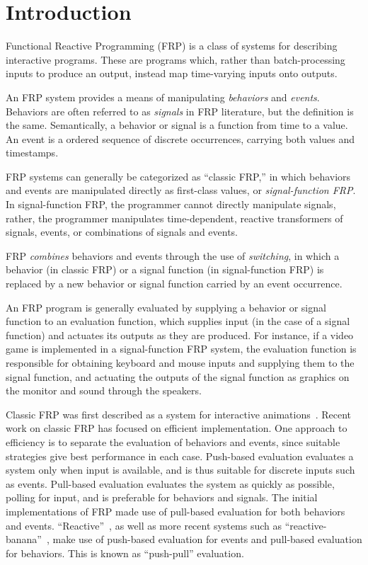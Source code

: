 \section{Introduction}
\label{section:Introduction}

Functional Reactive Programming (FRP) is a class of systems for describing
interactive programs. These are programs which, rather than batch-processing
inputs to produce an output, instead map time-varying inputs onto outputs.


An FRP system provides a means of manipulating {\em behaviors} and
{\em events}. Behaviors are often referred to as {\em signals} in FRP literature,
but the definition is the same.  Semantically, a behavior or signal is a
function from time to a value. An event is a ordered sequence of discrete
occurrences, carrying both values and timestamps.

FRP systems can generally be categorized as ``classic FRP,'' in which behaviors
and events are manipulated directly as first-class values,
or {\em signal-function FRP}. In signal-function FRP, the programmer cannot
directly manipulate signals, rather, the programmer manipulates time-dependent,
reactive transformers of signals, events, or combinations of signals and events.

FRP {\em combines} behaviors and events through the use of {\em switching}, in which
a behavior (in classic FRP) or a signal function (in signal-function FRP) is
replaced by a new behavior or signal function carried by an event occurrence.

An FRP program is generally evaluated by supplying a behavior or signal function
to an evaluation function, which supplies input (in the case of a signal
function) and actuates its outputs as they are produced. For instance, if a
video game is implemented in a signal-function FRP system, the evaluation
function is responsible for obtaining keyboard and mouse inputs and supplying
them to the signal function, and actuating the outputs of the signal function
as graphics on the monitor and sound through the speakers.

Classic FRP was first described as a system for interactive animations~\cite{Elliott1997}.
Recent work on classic FRP has focused on efficient implementation. One approach
to efficiency is to separate the evaluation of behaviors and events, since
suitable strategies give best performance in each case. Push-based evaluation
evaluates a system only when input is available, and is thus suitable for
discrete inputs such as events. Pull-based evaluation evaluates the system as
quickly as possible, polling for input, and is preferable for behaviors and
signals. The initial implementations of FRP made use of pull-based evaluation
for both behaviors and events. ``Reactive''~\cite{Elliott2009}, as well as more
recent systems such as ``reactive-banana''~\cite{Apfelmus}, make use of
push-based evaluation for events and pull-based evaluation for behaviors. This
is known as ``push-pull'' evaluation.

